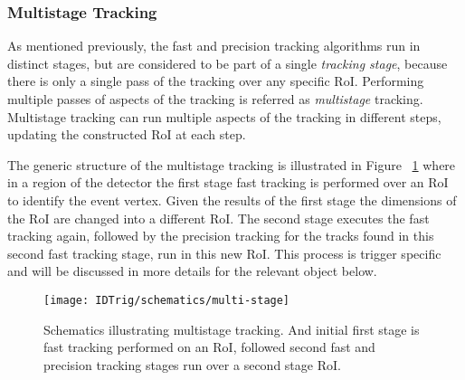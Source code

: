 		\subsubsection*{Multistage Tracking} 
	As mentioned previously, the fast and precision tracking algorithms run in distinct stages, but are considered to be part of a single \textit{tracking stage}, because there is only a single pass of the tracking over any specific \ac{RoI}. 
	Performing multiple passes of aspects of the tracking is referred as \textit{multistage} tracking. Multistage tracking can run multiple aspects of the tracking in different steps, updating the constructed \ac{RoI} at each step.
	
	The generic structure of the multistage tracking is illustrated in Figure ~\ref{fig:multi_stage} where in a region of the detector the first stage fast tracking is performed over an \ac{RoI} to identify the event vertex.
	 Given the results of the first stage the dimensions of the \ac{RoI} are changed into a different \ac{RoI}. 
	  The second stage executes the fast tracking again, followed by the precision tracking for the tracks found in this second fast tracking stage, run in this new \ac{RoI}. This process is trigger specific and will be discussed in more details for the relevant object below.
	\begin{figure}[!hbt]
	\centering
	\texttt{[image: IDTrig/schematics/multi-stage]}
	\caption{Schematics illustrating multistage tracking. And initial first stage is fast tracking performed on an \ac{RoI}, followed second fast and precision tracking stages run over a second stage \ac{RoI}.}
	\label{fig:multi_stage}
	\end{figure} 

